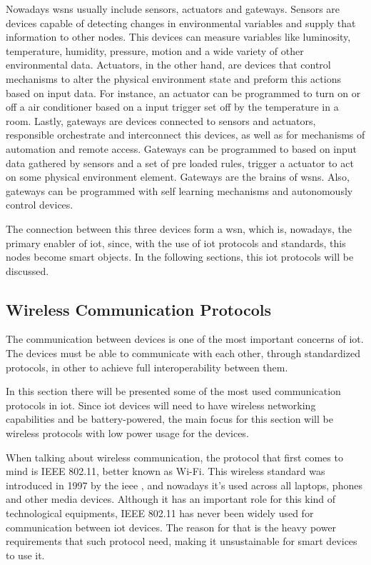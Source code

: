 Nowadays \ac*{wsn}s usually include sensors, actuators and gateways. Sensors are devices capable of detecting changes in environmental variables and supply that information to other nodes. This devices can measure variables like luminosity, temperature, humidity, pressure, motion and a wide variety of other environmental data. Actuators, in the other hand, are devices that control mechanisms to alter the physical environment state and preform this actions based on input data. For instance, an actuator can be programmed to turn on or off a air conditioner based on a input trigger set off by the temperature in a room.
Lastly, gateways are devices connected to sensors and actuators, responsible orchestrate and interconnect this devices, as well as for mechanisms of automation and remote access. Gateways can be programmed to based on input data gathered by sensors and a set of pre loaded rules, trigger a actuator to act on some physical environment element. Gateways are the brains of \ac{wsn}s. Also, gateways can be programmed with self learning mechanisms and autonomously control devices. 

The connection between this three devices form a \ac{wsn}, which is, nowadays, the primary enabler of \ac{iot}, since, with the use of \ac{iot} protocols and standards, this nodes become smart objects. In the following sections, this \ac{iot} protocols will be discussed.




\subsection{Wireless Communication Protocols}

The communication between devices is one of the most important concerns of \ac{iot}. The devices must be able to communicate with each other, through standardized protocols, in other to achieve full interoperability between them. 

In this section there will be presented some of the most used communication protocols in \ac{iot}. Since \ac{iot} devices will need to have wireless networking capabilities and be battery-powered, the main focus for this section will be wireless protocols with low power usage for the devices.

When talking about wireless communication, the protocol that first comes to mind is IEEE 802.11, better known as Wi-Fi. This wireless standard was introduced in 1997 by the \acf{ieee} \cite{Bellis2017}, and nowadays it's used across all laptops, phones and other media devices. Although it has an important role for this kind of technological equipments, IEEE 802.11 has never been widely used for communication between \ac{iot} devices. The reason for that is the heavy power requirements that such protocol need, making it unsustainable for smart devices to use it.

